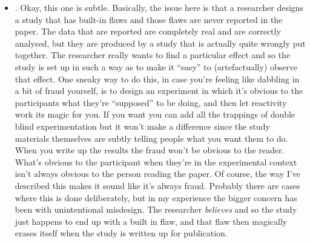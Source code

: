 \begin{itemize}
\item {}. Okay, this one is subtle. Basically, the issue here is that a researcher designs a study that has built-in flaws and those flaws are never reported in the paper. The data that are reported are completely real and are correctly analysed, but they are produced by a study that is actually quite wrongly put together. The researcher really wants to find a particular effect and so the study is set up in such a way as to make it ``easy'' to (artefactually) observe that effect. One sneaky way to do this, in case you're feeling like dabbling in a bit of fraud yourself, is to design an experiment in which it's  obvious to the participants what they're ``supposed'' to be doing, and then let reactivity work its magic for you. If you want you can add all the trappings of double blind experimentation but it won't make a difference since the study materials themselves are subtly telling people what you want them to do. When you write up the results the fraud won't be obvious to the reader. What's obvious to the participant when they're in the experimental context isn't always obvious to the person reading the paper. Of course, the way I've described this makes it sound like it's always fraud. Probably there are cases where this is done deliberately, but in my experience the bigger concern has been with unintentional misdesign. The researcher {\it believes} and so the study just happens to end up with a built in flaw, and that flaw then magically erases itself when the study is written up for publication.

\end{itemize}
